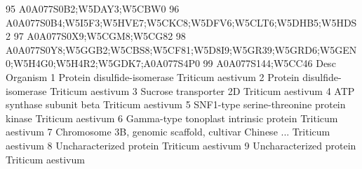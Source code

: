 \documentclass{beamer}
\begin{document}
\begin{frame}[fragile]
\begin{itemize}
\begin{Schunk}
\begin{Soutput}
95                                                                                                                                                                                                                                                                                                                                                       A0A077S0B2;W5DAY3;W5CBW0
96                                                                                                                                                                                                                                                                                                                    A0A077S0B4;W5I5F3;W5HVE7;W5CKC8;W5DFV6;W5CLT6;W5DHB5;W5HDS2
97                                                                                                                                                                                                                                                                                                                                                       A0A077S0X9;W5CGM8;W5CG82
98                                                                                                                                                                                                                                                                                    A0A077S0Y8;W5GGB2;W5CBS8;W5CF81;W5D8I9;W5GR39;W5GRD6;W5GEN0;W5H4G0;W5H4R2;W5GDK7;A0A077S4P0
99                                                                                                                                                                                                                                                                                                                                                              A0A077S144;W5CC46
                                                    Desc          Organism
1                            Protein disulfide-isomerase Triticum aestivum
2                            Protein disulfide-isomerase Triticum aestivum
3                                 Sucrose transporter 2D Triticum aestivum
4                              ATP synthase subunit beta Triticum aestivum
5              SNF1-type serine-threonine protein kinase Triticum aestivum
6                 Gamma-type tonoplast intrinsic protein Triticum aestivum
7  Chromosome 3B, genomic scaffold, cultivar Chinese ... Triticum aestivum
8                                Uncharacterized protein Triticum aestivum
9                                Uncharacterized protein Triticum aestivum

\end{Soutput}
\end{Schunk}
\end{itemize}
\end{frame}
\end{document}
